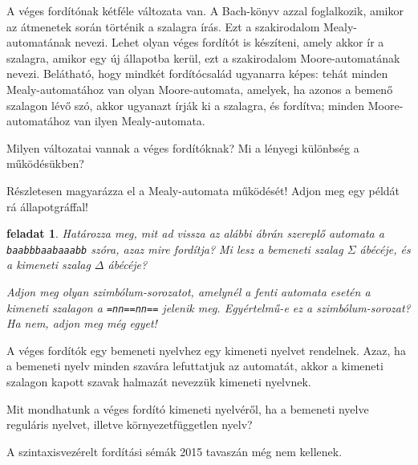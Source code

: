 \documentclass[a4paper]{article}
\newtheorem{feladat}{feladat}[section]
\begin{document}
A véges fordítónak kétféle változata van. A Bach-könyv azzal
foglalkozik, amikor az átmenetek során történik a szalagra írás. Ezt a
szakirodalom Mealy-automatának nevezi. Lehet olyan véges fordítót is
készíteni, amely akkor ír a szalagra, amikor egy új állapotba kerül, ezt
a szakirodalom Moore-automatának nevezi. Belátható, hogy mindkét
fordítócsalád ugyanarra képes: tehát minden Mealy-automatához van olyan
Moore-automata, amelyek, ha azonos a bemenő szalagon lévő szó, akkor
ugyanazt írják ki a szalagra, és fordítva; minden Moore-automatához van
ilyen Mealy-automata. 

Milyen változatai vannak a véges fordítóknak? Mi a lényegi különbség a
működésükben?

Részletesen magyarázza el a Mealy-automata működését! Adjon meg egy
példát rá állapotgráffal!

\begin{feladat}
Határozza meg, mit ad vissza az alábbi ábrán szereplő automata
a \verb!baabbbaabaaabb!  szóra, azaz mire fordítja?
Mi lesz a bemeneti szalag $\Sigma$ ábécéje, és a kimeneti szalag
$\Delta$ ábécéje?


Adjon meg olyan szimbólum-sorozatot, amelynél a fenti automata esetén a
kimeneti szalagon a \verb+=nn==nn==+ jelenik meg. Egyértelmű-e ez a
szimbólum-sorozat? Ha nem, adjon meg még egyet!
\end{feladat}

A véges fordítók egy bemeneti nyelvhez egy kimeneti nyelvet rendelnek.
Azaz, ha a bemeneti nyelv minden szavára lefuttatjuk az automatát,
akkor a kimeneti szalagon kapott szavak halmazát nevezzük kimeneti
nyelvnek.

Mit mondhatunk a véges fordító kimeneti nyelvéről,
ha a bemeneti nyelve reguláris nyelvet, illetve környezetfüggetlen
nyelv?

A szintaxisvezérelt fordítási sémák 2015 tavaszán még nem kellenek.
\end{document}

